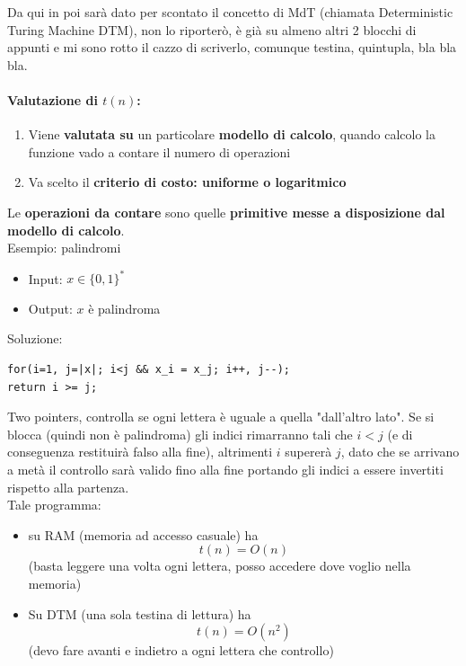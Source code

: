 \documentclass[11pt]{article}
\begin{document}
	Da qui in poi sarà dato per scontato il concetto di MdT (chiamata Deterministic Turing Machine DTM), non lo riporterò, è già su almeno altri 2 blocchi di appunti e mi sono rotto il cazzo di scriverlo, comunque testina, quintupla, bla bla bla.\\
	
	\newpage
	
	\paragraph{Valutazione di $t(n)$:}
	\begin{enumerate}
		\item Viene \textbf{valutata su} un particolare \textbf{modello di calcolo}, quando calcolo la funzione vado a contare il numero di operazioni
		\item Va scelto il \textbf{criterio di costo: uniforme o logaritmico}
	\end{enumerate} 
	
	Le \textbf{operazioni da contare} sono quelle \textbf{primitive messe a disposizione dal modello di calcolo}. \\
	Esempio: palindromi
	\begin{itemize}
		\item Input: $x \in \{0,1\}^\ast$
		\item Output: $x$ è palindroma
	\end{itemize}
	Soluzione: 
	\begin{lstlisting}
for(i=1, j=|x|; i<j && x_i = x_j; i++, j--);
return i >= j;
	\end{lstlisting}
	
	Two pointers, controlla se ogni lettera è uguale a quella "dall'altro lato". Se si blocca (quindi non è palindroma) gli indici rimarranno tali che $i < j$ (e di conseguenza restituirà falso alla fine), altrimenti $i$ supererà $j$, dato che se arrivano a metà il controllo sarà valido fino alla fine portando gli indici a essere invertiti rispetto alla partenza.\\
	
	Tale programma: 
	\begin{itemize}
		\item su RAM (memoria ad accesso casuale) ha 
		$$ t(n) = O(n) $$
		(basta leggere una volta ogni lettera, posso accedere dove voglio nella memoria)
		\item Su DTM (una sola testina di lettura) ha 
		$$ t(n) = O(n^2) $$
		(devo fare avanti e indietro a ogni lettera che controllo)
	\end{itemize}
	
\end{document}
